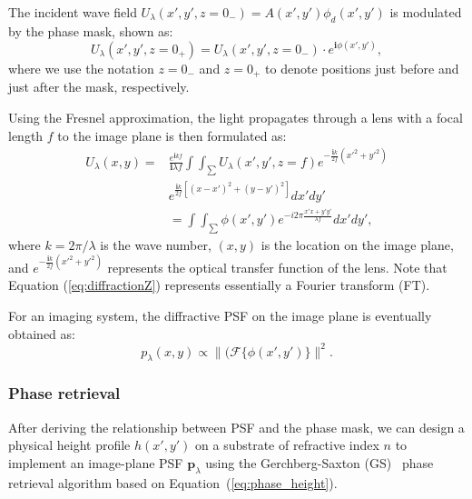 The incident wave field $U_{\lambda}(x',y',z=0_-) = A(x',
y')\phi_d(x',y')$ is modulated by the phase mask, shown as:
\begin{equation}\label{eq:incident_wave}
U_{\lambda}(x', y', z = 0_+) = U_{\lambda}(x',y',z=0_-) \cdot e^{\mathbf{i}\phi(x', y')},
\end{equation} 
where we use the notation $z=0_-$ and $z=0_+$ to denote positions just
before and just after the mask, respectively.


Using the Fresnel approximation, the light propagates through a lens
with a focal length $f$ to the image plane is then formulated as:
\begin{equation}
\label{eq:diffractionZ}
\begin{alignedat}{1}U_{\lambda}(x,y)= & \frac{e^{\mathbf{i}kf} } {\mathbf{i}\lambda f } \int\int_{\sum}
U_{\lambda}(x', y', z=f) e^{ -\frac{\mathbf{i}k}{2f} (x'^{2}+y'^{2}) }\\
 & e^ { \frac{\mathbf{i}k}{2f} \left[(x-x')^{2}+(y-y')^{2}\right] } dx'dy' \\
 &=  \int\int_{\sum} \phi(x', y') e^{ -i2\pi \frac{x'x+y'y'}{\lambda f} }dx'dy',
\end{alignedat}
\end{equation}
where $k=2\pi/\lambda$ is the wave number, $(x, y)$ is the location
on the image plane, and $e^{ -\frac{\mathbf{i}k}{2f} (x'^{2}+y'^{2}) }$ represents the optical transfer function of the lens. Note that Equation (\ref{eq:diffractionZ}) represents
essentially a Fourier transform (FT).


For an imaging system, the diffractive PSF on the image plane is
eventually obtained as:
\begin{equation}\label{eq:phase2PSF}
p_{\lambda}(x,y) \propto \| (\mathcal{F}\{\phi(x',y') \} \|^2.
\end{equation}
\subsubsection{Phase retrieval}
After deriving the relationship between PSF and the phase mask, we can
design a physical height profile $h(x', y')$ on a substrate of
refractive index $n$ to implement an image-plane PSF
$\bm{p}_{\lambda}$ using the Gerchberg-Saxton (GS)~\cite{GS1972} phase
retrieval algorithm based on Equation~(\ref{eq:phase_height}).

